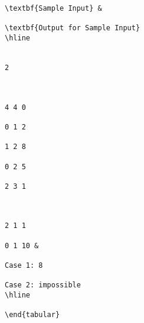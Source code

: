\begin{verbatim}
\textbf{Sample Input} & 

\textbf{Output for Sample Input}  
\hline


2

 

4 4 0

0 1 2

1 2 8

0 2 5

2 3 1

 

2 1 1

0 1 10 & 

Case 1: 8

Case 2: impossible  
\hline

\end{tabular}

 \end{verbatim}
